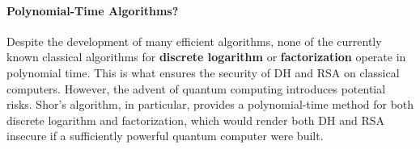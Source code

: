 \paragraph{Polynomial-Time Algorithms?}  
Despite the development of many efficient algorithms, none of the
currently known classical algorithms for \textbf{discrete logarithm}
or \textbf{factorization} operate in polynomial time. This is what
ensures the security of DH and RSA on classical computers. However,
the advent of quantum computing introduces potential risks. Shor's
algorithm, in particular, provides a polynomial-time method for both
discrete logarithm and factorization, which would render both DH and
RSA insecure if a sufficiently powerful quantum computer were built.

